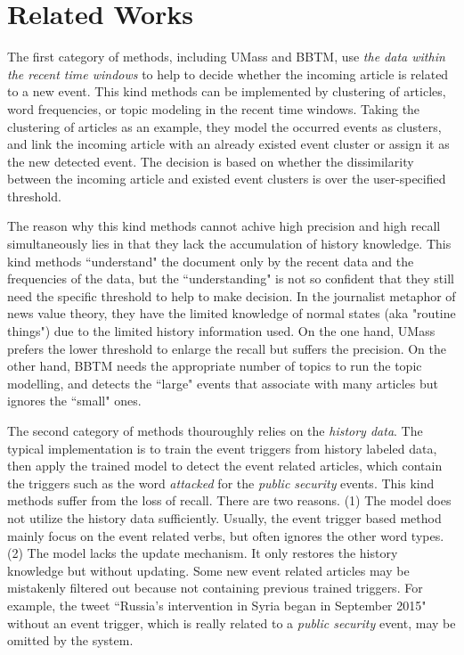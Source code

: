 \documentclass[conference,compsoc]{IEEEtran}
\begin{document}
\section{Related Works}
The first category of methods, including UMass\cite{Allan:2000wu} and BBTM\cite{yan2015probabilistic}, use \textit{the data within the recent time windows} to help to decide whether the incoming article is related to a new event. 
This kind methods can be implemented by clustering of articles\cite{Allan:2000wu}\cite{Petrovic:2010uj}\cite{Wurzer:2015wq}, word frequencies\cite{Mathioudakis:2010fc}\cite{Weng:2011wz}, or topic modeling\cite{Diao:2012wj}\cite{Yan:2015wm} in the recent time windows. 
Taking the clustering of articles as an example, they model the occurred events as clusters, and link the incoming article with an already existed event cluster or assign it as the new detected event.
The decision is based on whether the dissimilarity between the incoming article and existed event clusters is over the user-specified threshold. 

The reason why this kind methods cannot achive high precision and high recall simultaneously lies in that they lack the accumulation of history knowledge. 
This kind methods ``understand" the document only by the recent data and the frequencies of the data, but the ``understanding" is not so confident that they still need the specific threshold to help to make decision. In the journalist metaphor of news value theory, they have the limited knowledge of normal states (aka "routine things") due to the limited history information used. 
On the one hand, UMass\cite{Allan:2000wu} prefers the lower threshold to enlarge the recall but suffers the precision. 
On the other hand, BBTM needs the appropriate number of topics to run the topic modelling, and detects the ``large" events that associate with many articles but ignores the ``small" ones. 

The second category of methods thouroughly relies on the \textit{history data}. 
The typical implementation is to train the event triggers\cite{Li2013JointEE}\cite{Nguyen2015EventDA} from history labeled data, then apply the trained model to detect the event related articles, which contain the triggers such as the word \textit{attacked} for the \textit{public security} events. 
This kind methods suffer from the loss of recall. 
There are two reasons. 
(1) The model does not utilize the history data sufficiently. 
Usually, the event trigger based method mainly focus on the event related verbs, but often ignores the other word types.
(2) The model lacks the update mechanism. 
It only restores the history knowledge but without updating. 
Some new event related articles may be mistakenly filtered out because not containing previous trained triggers. 
For example, the tweet ``Russia's intervention in Syria began in September 2015" without an event trigger, which is really related to a \textit{public security} event, may be omitted by the system. 
\end{document}
